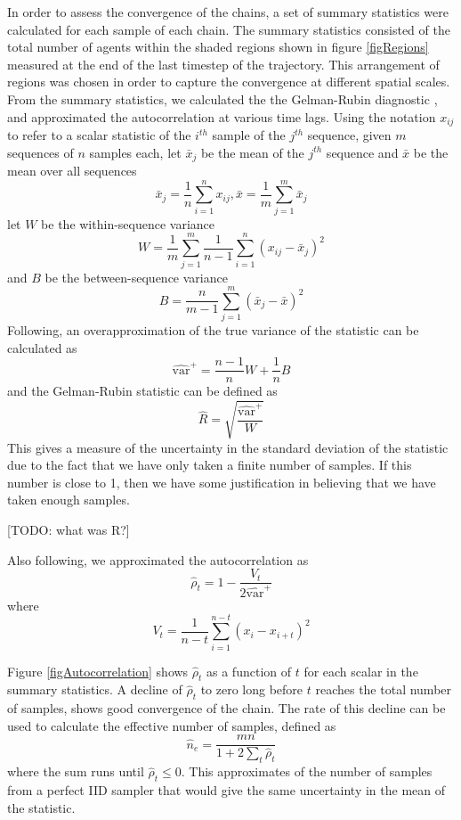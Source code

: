 \documentclass{article}
\begin{document}
In order to assess the convergence of the chains, a set of summary statistics were calculated for each sample of each chain. The summary statistics consisted of the total number of agents within the shaded regions shown in figure \ref{figRegions} measured at the end of the last timestep of the trajectory. This arrangement of regions was chosen in order to capture the convergence at different spatial scales. From the summary statistics, we calculated the the Gelman-Rubin diagnostic \cite{gelman1992inference}, and approximated the autocorrelation at various time lags. Using the notation $x_{ij}$ to refer to a scalar statistic of the $i^{th}$ sample of the $j^{th}$ sequence, given $m$ sequences of $n$ samples each, let $\bar{x}_j$ be the mean of the $j^{th}$ sequence and $\bar{x}$ be the mean over all sequences
\[
\bar{x}_j = \frac{1}{n}\sum_{i=1}^n x_{ij}, \bar{x} = \frac{1}{m}\sum_{j=1}^m \bar{x}_j
\]
let $W$ be the within-sequence variance
\[
W = \frac{1}{m} \sum_{j=1}^m \frac{1}{n-1} \sum_{i=1}^n (x_{ij} - \bar{x}_j)^2
\]
and $B$ be the between-sequence variance
\[
B = \frac{n}{m-1}\sum_{j=1}^m (\bar{x}_j - \bar{x})^2
\]
Following\cite{gelman2013bayesian}, an overapproximation of the true variance of the statistic can be calculated as
\[
\widehat{\text{var}}^+ = \frac{n-1}{n}W + \frac{1}{n}B
\]
and the Gelman-Rubin statistic can be defined as
\[
\hat{R} = \sqrt{\frac{\widehat{\text{var}}^+}{W}}
\]
This gives a measure of the uncertainty in the standard deviation of the statistic due to the fact that we have only taken a finite number of samples. If this number is close to 1, then we have some justification in believing that we have taken enough samples.

[TODO: what was R?]

Also following\cite{gelman2013bayesian}, we approximated the autocorrelation as
\[
\hat{\rho}_t = 1 - \frac{V_t}{2\widehat{\text{var}}^+}
\]
where
\[
V_t = \frac{1}{n-t} \sum_{i=1}^{n-t} (x_i - x_{i+t})^2
\]

Figure \ref{figAutocorrelation} shows $\hat{\rho}_t$ as a function of $t$ for each scalar in the summary statistics. A decline of $\hat{\rho}_t$ to zero long before $t$ reaches the total number of samples, shows good convergence of the chain. The rate of this decline can be used to calculate the effective number of samples, defined as
\[
\hat{n}_e = \frac{mn}{1 + 2\sum_{t} \hat{\rho}_t}
\]
where the sum runs until $\hat{\rho}_t \le 0$. This approximates of the number of samples from a perfect IID sampler that would give the same uncertainty in the mean of the statistic.
\end{document}
